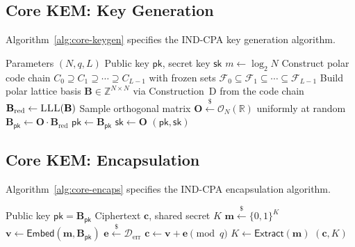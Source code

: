 \documentclass[11pt,a4paper]{article}
\newcommand{\CoreKEM}{\textsf{Core.KEM}\xspace}
\newcommand{\Extract}{\textsf{Extract}\xspace}
\newcommand{\INDCPA}{\textsf{IND-CPA}\xspace}
\newcommand{\bit}{\{0,1\}}
\newcommand{\Z}{\mathbb{Z}}
\newcommand{\R}{\mathbb{R}}
\newcommand{\sample}{\xleftarrow{\$}}
\newcommand{\pk}{\mathsf{pk}}
\newcommand{\sk}{\mathsf{sk}}
\begin{document}
\subsection{Core KEM: Key Generation}\label{sec:core-keygen}

Algorithm~\ref{alg:core-keygen} specifies the \INDCPA key generation algorithm.

\begin{algorithm}[H]
\caption{$\CoreKEM.\mathsf{KeyGen}()$}
\label{alg:core-keygen}
\begin{algorithmic}[1]
\REQUIRE Parameters $(N, q, L)$
\ENSURE Public key $\pk$, secret key $\sk$
\STATE $m \gets \log_2 N$
\STATE Construct polar code chain $C_0 \supseteq C_1 \supseteq \cdots \supseteq C_{L-1}$ with frozen sets $\mathcal{F}_0 \subseteq \mathcal{F}_1 \subseteq \cdots \subseteq \mathcal{F}_{L-1}$
\STATE Build polar lattice basis $\mathbf{B} \in \Z^{N \times N}$ via Construction~D from the code chain
\STATE $\mathbf{B}_{\text{red}} \gets \textsc{LLL}(\mathbf{B})$ 
\STATE Sample orthogonal matrix $\mathbf{O} \sample \mathcal{O}_N(\R)$ uniformly at random
\STATE $\mathbf{B}_{\pk} \gets \mathbf{O} \cdot \mathbf{B}_{\text{red}}$
\STATE $\pk \gets \mathbf{B}_{\pk}$
\STATE $\sk \gets \mathbf{O}$
\RETURN $(\pk, \sk)$
\end{algorithmic}
\end{algorithm}

\subsection{Core KEM: Encapsulation}\label{sec:core-encaps}

Algorithm~\ref{alg:core-encaps} specifies the \INDCPA encapsulation algorithm.

\begin{algorithm}[H]
\caption{$\CoreKEM.\mathsf{Encaps}(\pk)$}
\label{alg:core-encaps}
\begin{algorithmic}[1]
\REQUIRE Public key $\pk = \mathbf{B}_{\pk}$
\ENSURE Ciphertext $\mathbf{c}$, shared secret $K$
\STATE $\mathbf{m} \sample \bit^K$ 
\STATE $\mathbf{v} \gets \mathsf{Embed}(\mathbf{m}, \mathbf{B}_{\pk})$ 
\STATE $\mathbf{e} \sample \mathcal{D}_{\text{err}}$ 
\STATE $\mathbf{c} \gets \mathbf{v} + \mathbf{e} \pmod{q}$
\STATE $K \gets \Extract(\mathbf{m})$
\RETURN $(\mathbf{c}, K)$
\end{algorithmic}
\end{algorithm}
\end{document}
